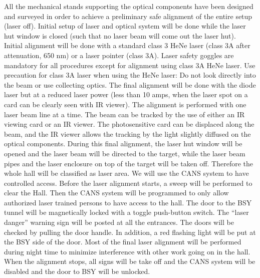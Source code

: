 All the mechanical stands supporting the optical components have been designed and
surveyed in order to achieve a preliminary safe alignment of the entire setup (laser
off).  Initial setup of laser and optical system will be done while the laser 
hut window is closed (such that no laser beam will come out the laser hut).
Initial alignment will be done with a standard class 3 HeNe laser  
(class 3A after attenuation, 650 nm) or a laser pointer (class 3A).
 Laser safety goggles are mandatory for all procedures except for alignment
 using class 3A HeNe laser. Use precaution for class 3A laser when using the 
HeNe laser: Do not look directly into the beam or use collecting optics.
The final alignment will be done with the diode laser but at a reduced laser power (less than 10 amps, when the laser spot on a card can be clearly
seen with IR viewer). The alignment is performed with one laser beam line at a time. 
The beam can be tracked by the use of either an IR viewing card or
an IR viewer.  The photosensitive card can be displaced along the beam, and
the IR viewer allows the tracking by the light slightly diffused on the optical
components. During this final alignment, the laser hut window will be opened 
and the laser beam will be directed to the target, while the laser beam pipes 
and the laser enclosure on top of the target will be taken off. Therefore the 
whole hall will be classified as laser area. We will use the CANS system
to have controlled access. Before the laser alignment starts, a sweep will
be performed to clear the Hall. Then the CANS system will be programmed to
only allow authorized laser trained persons to have access to the hall.   
The door to the BSY tunnel will be magnetically locked with a toggle push-button switch. The ``laser danger'' warning sign will be posted at all the entrances. The doors will be checked by pulling the door handle. In addition, a red flashing light will be put at the BSY side of the door.
Most of the final laser alignment will be 
performed during night time to minimize interference with other work going 
on in the hall. When the alignment stops, all signs will be take off and
the CANS system will be disabled and the door to BSY will be unlocked.

